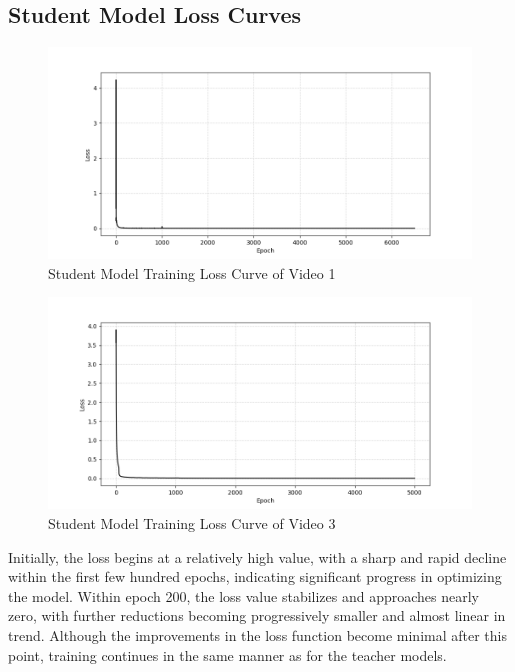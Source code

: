 \documentclass{ioereport}
\begin{document}
\subsection{Student Model Loss Curves}

\begin{figure}[H]
    \centering
    \includegraphics[width=1\linewidth,height=0.6\linewidth]{assets/quantization/student_vvsa_loss_curve.png}
    \caption{Student Model Training Loss Curve of Video 1}
    \label{fig:student-video-loss-curve-1}
\end{figure}

\begin{figure}[H]
    \centering
    \includegraphics[width=1\linewidth,height=0.6\linewidth]{assets/quantization/student_rick_loss_curve.png}
    \caption{Student Model Training Loss Curve of Video 3}
    \label{fig:student-video-loss-curve-3}
\end{figure}

Initially, the loss begins at a relatively high value, with a sharp and rapid decline within the first few hundred epochs, indicating significant progress in optimizing the model. Within epoch 200, the loss value stabilizes and approaches nearly zero, with further reductions becoming progressively smaller and almost linear in trend. Although the improvements in the loss function become minimal after this point, training continues in the same manner as for the teacher models.
\end{document}
